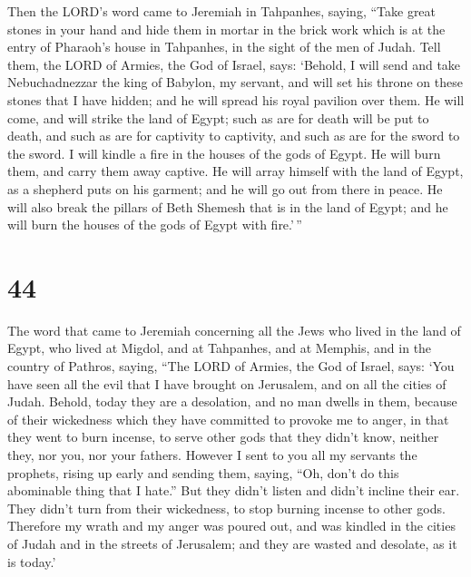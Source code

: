  Then the LORD's word came to Jeremiah in Tahpanhes,
saying,  ``Take great stones in your hand and hide them in
mortar in the brick work which is at the entry of Pharaoh's house in
Tahpanhes, in the sight of the men of Judah.  Tell them,
the LORD of Armies, the God of Israel, says: `Behold, I will send and
take Nebuchadnezzar the king of Babylon, my servant, and will set his
throne on these stones that I have hidden; and he will spread his royal
pavilion over them.  He will come, and will strike the
land of Egypt; such as are for death will be put to death, and such as
are for captivity to captivity, and such as are for the sword to the
sword.  I will kindle a fire in the houses of the gods of
Egypt. He will burn them, and carry them away captive. He will array
himself with the land of Egypt, as a shepherd puts on his garment; and
he will go out from there in peace.  He will also break
the pillars of Beth Shemesh that is in the land of Egypt; and he will
burn the houses of the gods of Egypt with fire.'\,''

\hypertarget{section-43}{%
\section{44}\label{section-43}}

 The word that came to Jeremiah concerning all the Jews
who lived in the land of Egypt, who lived at Migdol, and at Tahpanhes,
and at Memphis, and in the country of Pathros, saying, 
``The LORD of Armies, the God of Israel, says: `You have seen all the
evil that I have brought on Jerusalem, and on all the cities of Judah.
Behold, today they are a desolation, and no man dwells in them,
 because of their wickedness which they have committed to
provoke me to anger, in that they went to burn incense, to serve other
gods that they didn't know, neither they, nor you, nor your fathers.
 However I sent to you all my servants the prophets,
rising up early and sending them, saying, ``Oh, don't do this abominable
thing that I hate.''  But they didn't listen and didn't
incline their ear. They didn't turn from their wickedness, to stop
burning incense to other gods.  Therefore my wrath and my
anger was poured out, and was kindled in the cities of Judah and in the
streets of Jerusalem; and they are wasted and desolate, as it is today.'

